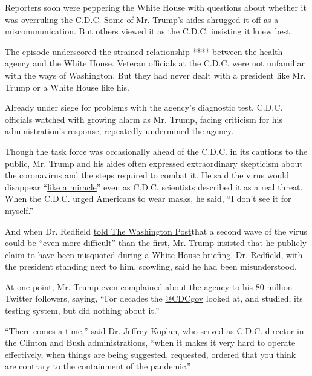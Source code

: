 Reporters soon were peppering the White House with questions about
whether it was overruling the C.D.C. Some of Mr. Trump's aides shrugged
it off as a miscommunication. But others viewed it as the C.D.C.
insisting it knew best.

The episode underscored the strained relationship **** between the
health agency and the White House. Veteran officials at the C.D.C. were
not unfamiliar with the ways of Washington. But they had never dealt
with a president like Mr. Trump or a White House like his.

Already under siege for problems with the agency's diagnostic test,
C.D.C. officials watched with growing alarm as Mr. Trump, facing
criticism for his administration's response, repeatedly undermined the
agency.

Though the task force was occasionally ahead of the C.D.C. in its
cautions to the public, Mr. Trump and his aides often expressed
extraordinary skepticism about the coronavirus and the steps required to
combat it. He said the virus would disappear
``\href{https://www.whitehouse.gov/briefings-statements/remarks-president-trump-meeting-african-american-leaders/}{like
a miracle}'' even as C.D.C. scientists described it as a real threat.
When the C.D.C. urged Americans to wear masks, he said,
``\href{https://www.nytimes3xbfgragh.onion/2020/04/09/us/politics/melania-trump-coronavirus.html}{I
don't see it for myself}.''

And when Dr. Redfield
\href{https://www.washingtonpost.com/health/2020/04/21/coronavirus-secondwave-cdcdirector/}{told
The Washington Post}that a second wave of the virus could be ``even more
difficult'' than the first, Mr. Trump insisted that he publicly claim to
have been misquoted during a White House briefing. Dr. Redfield, with
the president standing next to him, scowling, said he had been
misunderstood.

At one point, Mr. Trump even
\href{https://twitter.com/realDonaldTrump/status/1238410044263333894}{complained
about the agency} to his 80 million Twitter followers, saying, ``For
decades the \href{https://twitter.com/CDCgov}{@CDCgov} looked at, and
studied, its testing system, but did nothing about it.''

``There comes a time,'' said Dr. Jeffrey Koplan, who served as C.D.C.
director in the Clinton and Bush administrations, ``when it makes it
very hard to operate effectively, when things are being suggested,
requested, ordered that you think are contrary to the containment of the
pandemic.''

